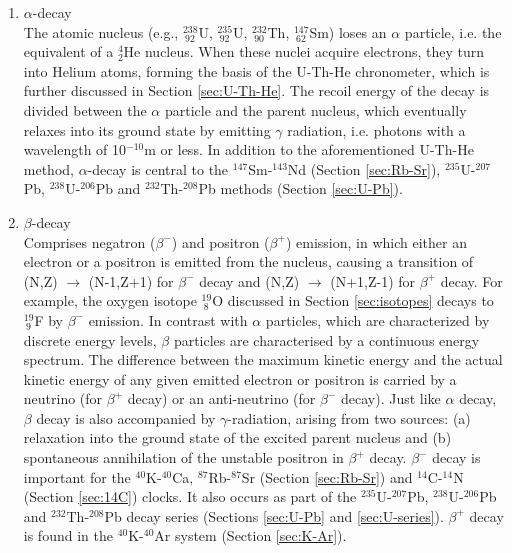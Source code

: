 \documentclass{book}
\begin{document}
\begin{enumerate}
\item{$\alpha$-decay}\\ The atomic nucleus (e.g., $^{238}_{~92}$U,
  $^{235}_{~92}$U, $^{232}_{~90}$Th, $^{147}_{~62}$Sm) loses an
  $\alpha$ particle, i.e. the equivalent of a $^4_2$He nucleus. When
  these nuclei acquire electrons, they turn into Helium atoms, forming
  the basis of the U-Th-He chronometer, which is further discussed in
  Section \ref{sec:U-Th-He}. The recoil energy of the decay is divided
  between the $\alpha$ particle and the parent nucleus, which
  eventually relaxes into its ground state by emitting $\gamma$
  radiation, i.e. photons with a wavelength of 10$^{-10}$m or less.
  In addition to the aforementioned U-Th-He method, $\alpha$-decay is
  central to the $^{147}$Sm-$^{143}$Nd (Section \ref{sec:Rb-Sr}),
  $^{235}$U-$^{207}$Pb, $^{238}$U-$^{206}$Pb and $^{232}$Th-$^{208}$Pb
  methods (Section \ref{sec:U-Pb}).

\item{$\beta$-decay}\\ Comprises negatron ($\beta^-$) and positron
  ($\beta^+$) emission, in which either an electron or a positron is
  emitted from the nucleus, causing a transition of (N,Z)
  $\rightarrow$ (N-1,Z+1) for $\beta^-$ decay and (N,Z) $\rightarrow$
  (N+1,Z-1) for $\beta^+$ decay. For example, the oxygen isotope
  $^{19}_{~8}$O discussed in Section \ref{sec:isotopes} decays to
  $^{19}_{~9}$F by $\beta^-$ emission.  In contrast with $\alpha$
  particles, which are characterized by discrete energy levels,
  $\beta$ particles are characterised by a continuous energy
  spectrum. The difference between the maximum kinetic energy and the
  actual kinetic energy of any given emitted electron or positron is
  carried by a neutrino (for $\beta^+$ decay) or an anti-neutrino (for
  $\beta^-$ decay). Just like $\alpha$ decay, $\beta$ decay is also
  accompanied by $\gamma$-radiation, arising from two sources: (a)
  relaxation into the ground state of the excited parent nucleus and
  (b) spontaneous annihilation of the unstable positron in $\beta^+$
  decay. $\beta^-$ decay is important for the $^{40}$K-$^{40}$Ca,
  $^{87}$Rb-$^{87}$Sr (Section \ref{sec:Rb-Sr}) and $^{14}$C-$^{14}$N
  (Section \ref{sec:14C}) clocks. It also occurs as part of the
  $^{235}$U-$^{207}$Pb, $^{238}$U-$^{206}$Pb and $^{232}$Th-$^{208}$Pb
  decay series (Sections \ref{sec:U-Pb} and
  \ref{sec:U-series}). $\beta^+$ decay is found in the
  $^{40}$K-$^{40}$Ar system (Section \ref{sec:K-Ar}).


\end{enumerate}
\end{document}

